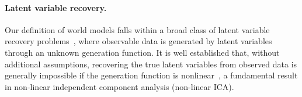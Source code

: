 
\paragraph{Latent variable recovery.} Our definition of world models falls within a broad class of latent variable recovery problems~\citep{everett2013introduction}, where observable data is generated by latent variables through an unknown generation function. It is well established that, without additional assumptions, recovering the true latent variables from observed data is generally impossible if the generation function is nonlinear~\citep{hyvarinen_nonlinear_1999,khemakhem_variational_2020}, a fundamental result in non-linear independent component analysis (non-linear ICA).

